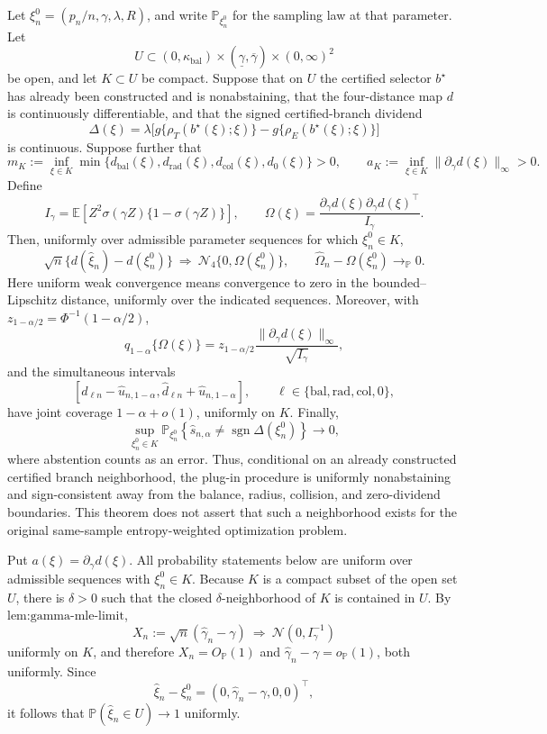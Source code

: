 Let \(\xi_n^0=(p_n/n,\gamma,\lambda,R)\), and write \(\mathbb P_{\xi_n^0}\) for the sampling law at that parameter.  Let
\[
 U\subset (0,\kappa_{\mathrm{bal}})\times
 (\underline\gamma,\overline\gamma)\times(0,\infty)^2
\]
be open, and let \(K\subset U\) be compact.  Suppose that on \(U\) the certified selector \(b^\star\) has already been constructed and is nonabstaining, that the four-distance map \(d\) is continuously differentiable, and that the signed certified-branch dividend
\[
 \Delta(\xi)=\lambda\bigl[g\{\rho_T(b^\star(\xi);\xi)\}
                    -g\{\rho_E(b^\star(\xi);\xi)\}\bigr]
\]
is continuous.  Suppose further that
\[
 m_K:=\inf_{\xi\in K}
 \min\{d_{\mathrm{bal}}(\xi),d_{\mathrm{rad}}(\xi),
        d_{\mathrm{col}}(\xi),d_0(\xi)\}>0,
 \qquad
 a_K:=\inf_{\xi\in K}\|\partial_\gamma d(\xi)\|_\infty>0.
\]
Define
\[
 I_\gamma=\mathbb E\!\left[Z^2\sigma(\gamma Z)
                       \{1-\sigma(\gamma Z)\}\right],
 \qquad
 \Omega(\xi)=
 \frac{\partial_\gamma d(\xi)\partial_\gamma d(\xi)^\top}{I_\gamma}.
\]
Then, uniformly over admissible parameter sequences for which \(\xi_n^0\in K\),
\[
 \sqrt n\{d(\widehat\xi_n)-d(\xi_n^0)\}
 \ \Rightarrow\ \mathcal N_4\{0,\Omega(\xi_n^0)\},
 \qquad
 \widehat\Omega_n-\Omega(\xi_n^0)\to_{\mathbb P}0.
\]
Here uniform weak convergence means convergence to zero in the bounded--Lipschitz distance, uniformly over the indicated sequences.  Moreover, with \(z_{1-\alpha/2}=\Phi^{-1}(1-\alpha/2)\),
\[
 q_{1-\alpha}\{\Omega(\xi)\}
 =z_{1-\alpha/2}\frac{\|\partial_\gamma d(\xi)\|_\infty}{\sqrt{I_\gamma}},
\]
and the simultaneous intervals
\[
 [\widehat d_{\ell n}-\widehat u_{n,1-\alpha},
   \widehat d_{\ell n}+\widehat u_{n,1-\alpha}],
 \qquad \ell\in\{\mathrm{bal},\mathrm{rad},\mathrm{col},0\},
\]
have joint coverage \(1-\alpha+o(1)\), uniformly on \(K\).  Finally,
\[
 \sup_{\xi_n^0\in K}
 \mathbb P_{\xi_n^0}\!\left\{
   \widehat s_{n,\alpha}\ne\operatorname{sgn}\Delta(\xi_n^0)
 \right\}\longrightarrow0,
\]
where abstention counts as an error.  Thus, conditional on an already constructed certified branch neighborhood, the plug-in procedure is uniformly nonabstaining and sign-consistent away from the balance, radius, collision, and zero-dividend boundaries.  This theorem does not assert that such a neighborhood exists for the original same-sample entropy-weighted optimization problem.

Put \(a(\xi)=\partial_\gamma d(\xi)\).  All probability statements below are uniform over admissible sequences with \(\xi_n^0\in K\).  Because \(K\) is a compact subset of the open set \(U\), there is \(\delta>0\) such that the closed \(\delta\)-neighborhood of \(K\) is contained in \(U\).  By \(\text{lem:gamma-mle-limit}\),
\[
 X_n:=\sqrt n(\widehat\gamma_n-\gamma)
 \ \Rightarrow\ \mathcal N(0,I_\gamma^{-1})
\]
uniformly on \(K\), and therefore \(X_n=O_{\mathbb P}(1)\) and \(\widehat\gamma_n-\gamma=o_{\mathbb P}(1)\), both uniformly.  Since
\[
 \widehat\xi_n-\xi_n^0=(0,\widehat\gamma_n-\gamma,0,0)^\top,
\]
it follows that \(\mathbb P(\widehat\xi_n\in U)\to1\) uniformly.

